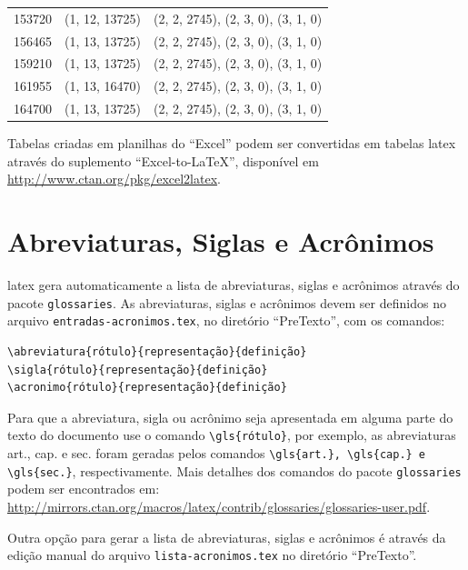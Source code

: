 \begin{longtable}{@{\extracolsep{\fill}}lll}
153720 & (1, 12, 13725) & (2, 2, 2745), (2, 3, 0), (3, 1, 0)                  \\
156465 & (1, 13, 13725) & (2, 2, 2745), (2, 3, 0), (3, 1, 0)                  \\
159210 & (1, 13, 13725) & (2, 2, 2745), (2, 3, 0), (3, 1, 0)                  \\
161955 & (1, 13, 16470) & (2, 2, 2745), (2, 3, 0), (3, 1, 0)                  \\
164700 & (1, 13, 13725) & (2, 2, 2745), (2, 3, 0), (3, 1, 0)                  \\
\end{longtable}

Tabelas criadas em planilhas do ``Excel'' podem ser convertidas em tabelas \gls{latex} através do suplemento ``Excel-to-LaTeX'', disponível em \url{http://www.ctan.org/pkg/excel2latex}.

\section{Abreviaturas, Siglas e Acrônimos}\label{sec:acronimos}

\gls{latex} gera automaticamente a lista de abreviaturas, siglas e acrônimos através do pacote \texttt{glossaries}. As abreviaturas, siglas e acrônimos devem ser definidos no arquivo \texttt{entradas-acronimos.tex}, no diretório ``PreTexto'', com os comandos:

\begin{SingleSpacing}%
\begin{verbatim}
\abreviatura{rótulo}{representação}{definição}
\sigla{rótulo}{representação}{definição}
\acronimo{rótulo}{representação}{definição}
\end{verbatim}
\end{SingleSpacing}

Para que a abreviatura, sigla ou acrônimo seja apresentada em alguma parte do texto do documento use o comando \verb|\gls{rótulo}|, por exemplo, as abreviaturas \gls{art.}, \gls{cap.} e \gls{sec.} foram geradas pelos comandos \verb|\gls{art.}, \gls{cap.} e \gls{sec.}|, respectivamente. Mais detalhes dos comandos do pacote \texttt{glossaries} podem ser encontrados em: \url{http://mirrors.ctan.org/macros/latex/contrib/glossaries/glossaries-user.pdf}.

Outra opção para gerar a lista de abreviaturas, siglas e acrônimos é através da edição manual do arquivo \texttt{lista-acronimos.tex} no diretório ``PreTexto''.

